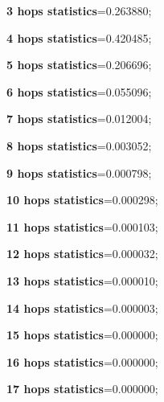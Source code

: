 \documentclass[a4paper]{article}
\begin{document}
\textbf{3 hops statistics}=0.263880;

\textbf{4 hops statistics}=0.420485;

\textbf{5 hops statistics}=0.206696;

\textbf{6 hops statistics}=0.055096;

\textbf{7 hops statistics}=0.012004;

\textbf{8 hops statistics}=0.003052;

\textbf{9 hops statistics}=0.000798;

\textbf{10 hops statistics}=0.000298;

\textbf{11 hops statistics}=0.000103;

\textbf{12 hops statistics}=0.000032;

\textbf{13 hops statistics}=0.000010;

\textbf{14 hops statistics}=0.000003;

\textbf{15 hops statistics}=0.000000;

\textbf{16 hops statistics}=0.000000;

\textbf{17 hops statistics}=0.000000;
\end{document}
